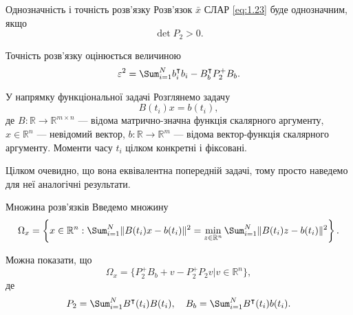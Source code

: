 \begin{mframe}{Однозначність і точність розв'язку}
    Розв'язок $\bar x$ СЛАР \eqref{eq:1.23} буде однозначним, якщо
    \begin{equation}
        \label{eq:1.28}
        \det P_2 > 0.
    \end{equation}

    Точність розв'язку оцінюється величиною
    \begin{equation}
        \label{eq:1.22}
        \varepsilon^2 = \Sum_{i = 1}^N b_i^\intercal b_i - 
        B_b^\intercal P_2^+ B_b.
    \end{equation}
\end{mframe}

\begin{mframe}{У напрямку функціональної задачі}
    Розглянемо задачу
    \begin{equation}
        \label{eq:1.30}
        B(t_i) x = b(t_i),
    \end{equation}
    де $B: \mathbb{R} \to \mathbb{R}^{m \times n}$ --- відома матрично-значна
    функція скалярного аргументу, $x \in \mathbb{R}^n$ --- невідомий вектор,
    $b: \mathbb{R} \to \mathbb{R}^m$ --- відома вектор-функція скалярного
    аргументу. Моменти часу $t_i$ цілком конкретні і фіксовані. \medskip
    
    Цілком очевидно, що вона еквівалентна попередній задачі, тому просто
    наведемо для неї аналогічні результати.
\end{mframe}

\begin{mframe}{Множина розв'язків}
    Введемо множину
    \begin{equation}
        \label{eq:1.31}
        \Omega_x = \left\{ x \in \mathbb{R}^n: \Sum_{i = 1}^N 
        \|B(t_i) x - b(t_i)\|^2 = \min_{z \in \mathbb{R}^n} 
        \Sum_{i = 1}^N \|B(t_i) z - b(t_i)\|^2 \right\}.
    \end{equation}
    
    Можна показати, що
    \begin{equation}
        \label{eq:1.26b}
        \Omega_x = \Big\{ P_2^+ B_b + v - P_2^+ P_2 v \Big| 
        v \in \mathbb{R}^n \Big\},
    \end{equation}
    де
    \begin{equation*}
        P_2 = \Sum_{i = 1}^N B^\intercal(t_i) B(t_i), \quad B_b = 
        \Sum_{i = 1}^N B^\intercal(t_i) b(t_i).
    \end{equation*}
\end{mframe}

